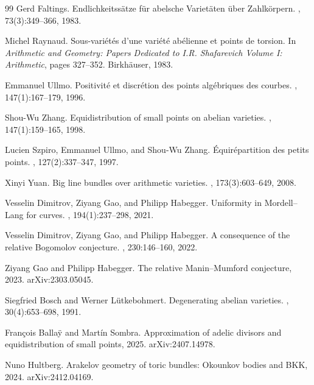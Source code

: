 \documentclass[10pt,a4paper]{amsart}
\theoremstyle{plain}
\theoremstyle{plain}
\numberwithin{equation}{section}
\begin{document}
\begin{thebibliography}{99}
		Gerd Faltings.
		\newblock Endlichkeitss{\"a}tze f{\"u}r abelsche Variet{\"a}ten {\"u}ber Zahlk{\"o}rpern.
		, 73(3):349--366, 1983.
		
		Michel Raynaud.
		\newblock Sous-vari\'et\'es d'une vari\'et\'e ab\'elienne et points de torsion.
		\newblock In {\em Arithmetic and Geometry: Papers Dedicated to I.R. Shafarevich Volume I: Arithmetic}, pages 327--352. Birkh{\"a}user, 1983.
		
		Emmanuel Ullmo.
		\newblock Positivit\'e et discr\'etion des points alg\'ebriques des courbes.
		, 147(1):167--179, 1996.
		
		Shou-Wu Zhang.
		\newblock Equidistribution of small points on abelian varieties.
		, 147(1):159--165, 1998.
		
		Lucien Szpiro, Emmanuel Ullmo, and Shou-Wu Zhang.
		\newblock \'Equir\'epartition des petits points.
		, 127(2):337--347, 1997.
		
		Xinyi Yuan.
		\newblock Big line bundles over arithmetic varieties.
		, 173(3):603--649, 2008.
		
		Vesselin Dimitrov, Ziyang Gao, and Philipp Habegger.
		\newblock Uniformity in Mordell--Lang for curves.
		, 194(1):237--298, 2021.
		
		Vesselin Dimitrov, Ziyang Gao, and Philipp Habegger.
		\newblock A consequence of the relative Bogomolov conjecture.
		, 230:146--160, 2022.
		
		Ziyang Gao and Philipp Habegger.
		\newblock The relative Manin--Mumford conjecture, 2023.
		\newblock arXiv:2303.05045.
		
		Siegfried Bosch and Werner L{\"u}tkebohmert.
		\newblock Degenerating abelian varieties.
		, 30(4):653--698, 1991.
		
		Fran{\c c}ois Balla{\"y} and Mart\'in Sombra.
		\newblock Approximation of adelic divisors and equidistribution of small points, 2025.
		\newblock arXiv:2407.14978.
		
		Nuno Hultberg.
		\newblock Arakelov geometry of toric bundles: Okounkov bodies and BKK, 2024.
		\newblock arXiv:2412.04169.
		

\end{thebibliography}
\end{document}
